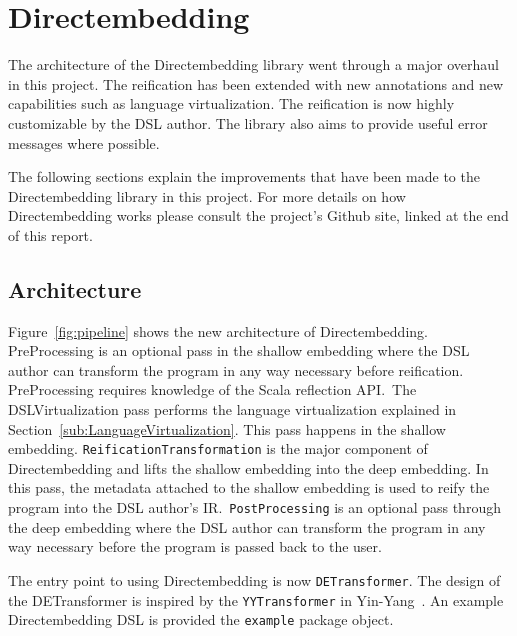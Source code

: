 \section{Directembedding} %
\label{sec:Directembedding}
The architecture of the Directembedding library went through a major overhaul in this project.
The reification has been extended with new annotations and new capabilities such as language virtualization.
The reification is now highly customizable by the DSL author.
The library also aims to provide useful error messages where possible.

The following sections explain the improvements that have been made to the Directembedding library in this project.
For more details on how Directembedding works please consult the project's Github site, linked at the end of this report.

\subsection{Architecture} %
\label{sub:Architecture}
Figure~\ref{fig:pipeline} shows the new architecture of Directembedding.
PreProcessing is an optional pass in the shallow embedding where the DSL author can transform the program in any way necessary before reification.
PreProcessing requires knowledge of the Scala reflection API.\
The DSLVirtualization pass performs the language virtualization explained in Section~\ref{sub:LanguageVirtualization}.
This pass happens in the shallow embedding.
\texttt{ReificationTransformation} is the major component of Directembedding and lifts the shallow embedding into the deep embedding.
In this pass, the metadata attached to the shallow embedding is used to reify the program into the DSL author's IR.\
\texttt{PostProcessing} is an optional pass through the deep embedding where the DSL author can transform the program in any way necessary before the program is passed back to the user.


The entry point to using Directembedding is now \texttt{DETransformer}.
The design of the DETransformer is inspired by the \texttt{YYTransformer} in Yin-Yang~\autocite{jovanovic_yin-yang:_2014}.
An example Directembedding DSL is provided the \texttt{example} package object.

